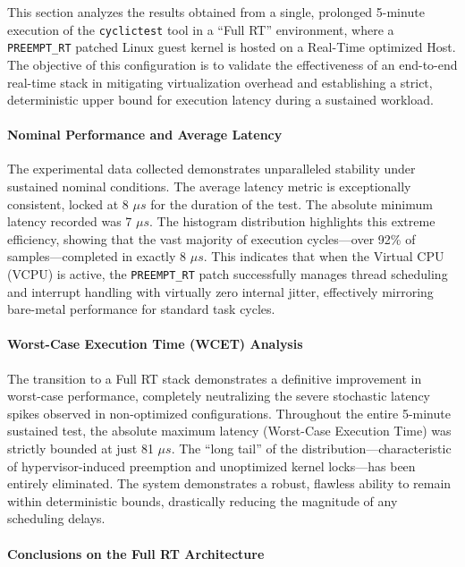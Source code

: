 This section analyzes the results obtained from a single, prolonged
5-minute execution of the \texttt{cyclictest} tool in a ``Full RT''
environment, where a \texttt{PREEMPT\_RT} patched Linux guest kernel is
hosted on a Real-Time optimized Host. The objective of this
configuration is to validate the effectiveness of an end-to-end
real-time stack in mitigating virtualization overhead and establishing a
strict, deterministic upper bound for execution latency during a
sustained workload.

\paragraph{Nominal Performance and Average
Latency}\label{nominal-performance-and-average-latency-2}

The experimental data collected demonstrates unparalleled stability
under sustained nominal conditions. The average latency metric is
exceptionally consistent, locked at 8 $\mu s$ for the duration of the test.
The absolute minimum latency recorded was 7 $\mu s$. The histogram
distribution highlights this extreme efficiency, showing that the vast
majority of execution cycles---over 92\% of samples---completed in
exactly 8 $\mu s$. This indicates that when the Virtual CPU (VCPU) is active,
the \texttt{PREEMPT\_RT} patch successfully manages thread scheduling
and interrupt handling with virtually zero internal jitter, effectively
mirroring bare-metal performance for standard task cycles.

\paragraph{Worst-Case Execution Time (WCET)
Analysis}\label{worst-case-execution-time-wcet-analysis-2}

The transition to a Full RT stack demonstrates a definitive improvement
in worst-case performance, completely neutralizing the severe stochastic
latency spikes observed in non-optimized configurations. Throughout the
entire 5-minute sustained test, the absolute maximum latency (Worst-Case
Execution Time) was strictly bounded at just 81 $\mu s$. The ``long tail'' of
the distribution---characteristic of hypervisor-induced preemption and
unoptimized kernel locks---has been entirely eliminated. The system
demonstrates a robust, flawless ability to remain within deterministic
bounds, drastically reducing the magnitude of any scheduling delays.

\paragraph{Conclusions on the Full RT
Architecture}\label{conclusions-on-the-full-rt-architecture}

